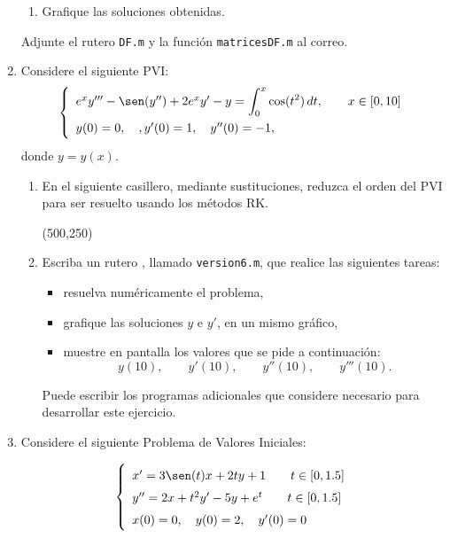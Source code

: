 \documentclass[legalpaper,11pt]{article}
\begin{document}
\begin{enumerate}
\begin{enumerate}
\item {} Grafique las soluciones obtenidas.
\end{enumerate}

Adjunte el rutero \texttt{DF.m} y la funci\'on \texttt{matricesDF.m} al correo.


\newpage
{}
 \item Considere el siguiente PVI:
 $$
 \left\{
 \renewcommand*{\arraystretch}{1.5}
 \begin{array}{l}
 e^xy'''-\sen(y'')+2e^xy'-y=\displaystyle\int_0^x\cos(t^2)\,dt,\qquad x\in[0,10]\\
 y(0)=0,\quad, y'(0)=1,\quad y''(0)=-1,
 \end{array}
 \right.
 $$
 donde $y=y(x)$.
 \begin{enumerate}
 \item {} En el siguiente casillero, mediante sustituciones, reduzca el orden del PVI para ser resuelto usando los m\'etodos RK.

\hspace{-10mm}
\framebox(500,250){}
\item  Escriba un rutero \matlab, llamado \verb"version6.m", que realice las siguientes tareas:
\begin{itemize}
\item {} resuelva num\'ericamente el problema,
\item {} grafique las soluciones $y$ e $y'$, en un mismo gr\'afico,
\item {} muestre en pantalla los valores que se pide a continuaci\'on:
$$
y(10),\qquad y'(10),\qquad y''(10), \qquad y'''(10).
$$
\end{itemize}
Puede escribir los programas adicionales que considere necesario para desarrollar este ejercicio.
 \end{enumerate}


\newpage
{}
\item Considere el siguiente Problema de Valores Iniciales:

$$
\left\{
\renewcommand*{\arraystretch}{1.5}
\begin{array}{l}
 x'=3\sen(t)x+2ty+1 \qquad t\in[0, 1{.}5]\\
y''=2x+t^2y'-5y+e^t\qquad t\in[0, 1{.}5]\\
x(0)=0,\quad y(0)=2,\quad y'(0)=0\\
\end{array}\right.
$$


\end{enumerate}
\end{document}
